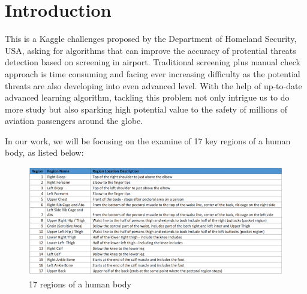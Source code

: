 \documentclass[conference,compsoc]{IEEEtran}
\begin{document}
\section{Introduction}
	\par
	This is a Kaggle challenges proposed by the Department of Homeland Security, USA, asking for algorithms that can improve the accuracy of protential threats detection based on screening in airport. Traditional screening plus manual check approach is time consuming and facing ever increasing difficulty as the potential threats are also developing into even advanced level. With the help of up-to-date advanced learning algorithm, tackling this problem not only intrigue us to do more study but also sparking high potential value to the safety of millions of aviation passengers around the globe.
	\par
	In our work, we will be focusing on the examine of 17 key regions of a human body, as listed below:
	\begin{figure}[h]
		\includegraphics[scale=0.35]{Pic/body_zones.png}
		\caption{17 regions of a human body}
	\end{figure}
\end{document}
